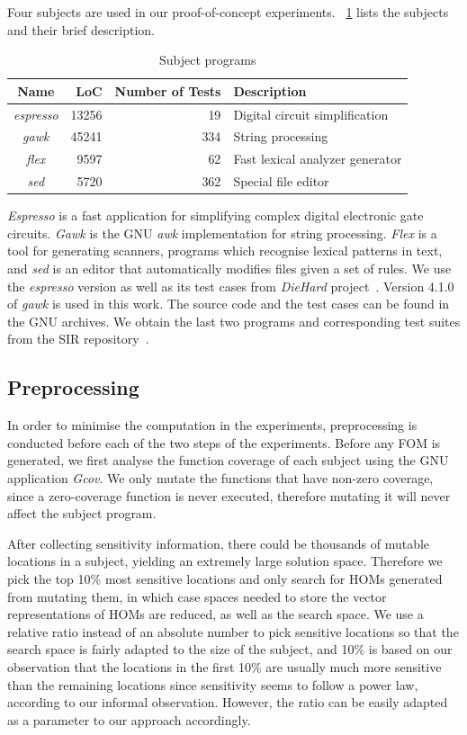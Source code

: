 \documentclass[oribibl]{llncs}
\begin{document}
Four subjects are used in our proof-of-concept experiments. 
\tablename~\ref{tab_subject} lists the subjects and their brief description.

\begin{table}[ht]
\centering
\caption{Subject programs}
\label{tab_subject}
\begin{tabular}{crrl}
\hline
Name & LoC & Number of Tests & Description \\
\hline
\emph{espresso} & 13256 & 19 & Digital circuit simplification\\
\emph{gawk} & 45241 & 334 & String processing\\
\emph{flex} & 9597 & 62 & Fast lexical analyzer generator\\
\emph{sed} & 5720 & 362 & Special file editor\\
\hline
\end{tabular}%
\end{table}

\emph{Espresso} is a fast application for simplifying complex digital electronic gate circuits.
\emph{Gawk} is the GNU \emph{awk} implementation for string processing.
\emph{Flex} is a tool for generating scanners, programs which recognise lexical patterns in text, and \emph{sed} is an editor that automatically modifies files given a set of rules. 
We use the \emph{espresso} version as well as its test cases from \emph{DieHard} project~\cite{Berger:2006:DPM:1133981.1134000}.
Version 4.1.0 of \emph{gawk} is used in this work.
The source code and the test cases can be found in the GNU archives.
We obtain the last two programs and corresponding test suites from the SIR repository~\cite{SIR2005}. 

\subsection{Preprocessing}
\label{sec_preprocessing}

In order to minimise the computation in the experiments, preprocessing is conducted before each of the two steps of the experiments.
Before any FOM is generated, we first analyse the function coverage of each subject using the GNU application \emph{Gcov}.
We only mutate the functions that have non-zero coverage, since a zero-coverage function is never executed, therefore mutating it will never affect the subject program.

After collecting sensitivity information, there could be thousands of mutable locations in a subject, yielding an extremely large solution space.
Therefore we pick the top 10\% most sensitive locations and only search for HOMs generated from mutating them, in which case spaces needed to store the vector representations of HOMs are reduced, as well as the search space.
We use a relative ratio instead of an absolute number to pick sensitive locations so that the search space is fairly adapted to the size of the subject, and 10\% is based on our observation that the locations in the first 10\% are usually much more sensitive than the remaining locations since sensitivity seems to follow a power law, according to our informal observation.
However, the ratio can be easily adapted as a parameter to our approach accordingly.
\end{document}
